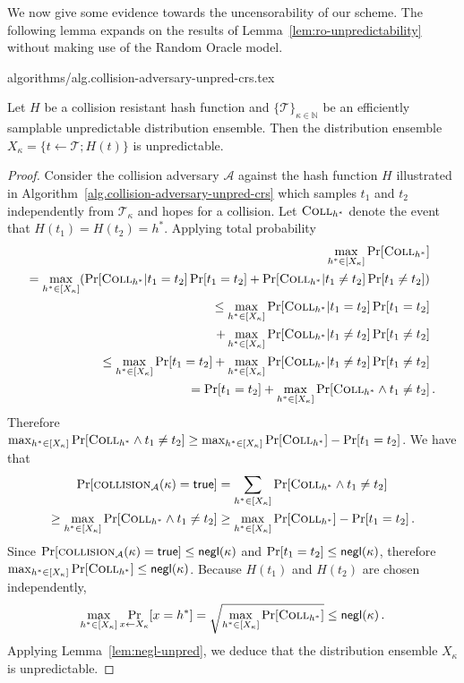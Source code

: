 We now give some evidence towards the uncensorability of our scheme.
The following lemma expands on the results of Lemma~\ref{lem:ro-unpredictability} without making use of the Random Oracle model.

{algorithms/alg.collision-adversary-unpred-crs.tex}

\newcommand{\collstar}{\textsc{Coll}_{h^*}}

\begin{lem}
  Let $H$ be a collision resistant hash function and $\{\mathcal{T}\}_{\kappa\in\mathbb{N}}$ be an
  efficiently samplable unpredictable distribution ensemble. Then the
  distribution ensemble $X_\kappa = \{ t \gets \mathcal{T}; H(t) \}$ is unpredictable.
\end{lem}
\begin{proof}
  Consider the collision adversary $\mathcal{A}$ against the hash function $H$ illustrated in Algorithm~\ref{alg.collision-adversary-unpred-crs} which samples $t_1$ and $t_2$ independently from $\mathcal{T}_\kappa$ and hopes for a collision. Let $\collstar$ denote the event that $H(t_1) = H(t_2) = h^*$.
  Applying total probability
  \begin{align*}
  \max_{h^* \in [X_\kappa]}\Pr[\collstar]&
  \\=
  \max_{h^* \in [X_\kappa]}(\Pr[\collstar|t_1 = t_2]\Pr[t_1 = t_2]
   + \Pr[\collstar|t_1 \neq t_2]\Pr[t_1 \neq t_2])&
  \\\leq
  \max_{h^* \in [X_\kappa]}\Pr[\collstar|t_1 = t_2]\Pr[t_1 = t_2]&
  \\ + \max_{h^* \in [X_\kappa]}\Pr[\collstar|t_1 \neq t_2]\Pr[t_1 \neq t_2]&
  \\\leq
  \max_{h^* \in [X_\kappa]}\Pr[t_1 = t_2]
  + \max_{h^* \in [X_\kappa]}\Pr[\collstar|t_1 \neq t_2]\Pr[t_1 \neq t_2]&
  \\=
  \Pr[t_1 = t_2]
  + \max_{h^* \in [X_\kappa]}\Pr[\collstar \land t_1 \neq t_2]&
  \,.
  \end{align*}
  Therefore $\max_{h^* \in [X_\kappa]}\Pr[\collstar \land t_1 \neq t_2] \geq \max_{h^* \in [X_\kappa]}\Pr[\collstar] - \Pr[t_1 = t_2]$.
  We have that
  \begin{align*}
    \Pr[\collisionattack_{\mathcal{A}}(\kappa) = \true] &=
    \sum_{h^* \in [X_\kappa]} \Pr[\collstar \land t_1 \neq t_2]\\\geq
    \max_{h^* \in [X_\kappa]} \Pr[\collstar \land t_1 \neq t_2]
    &\geq
    \max_{h^* \in [X_\kappa]}\Pr[\collstar] - \Pr[t_1 = t_2]\,.
  \end{align*}
  Since $\Pr[\textsc{collision}_{\mathcal{A}}(\kappa) = \mathsf{true}] \leq \textsf{negl}(\kappa)$
  and $\Pr[t_1 = t_2] \leq \textsf{negl}(\kappa)$, therefore $\max_{h^* \in [X_\kappa]} \Pr[\collstar] \leq \negl$.
  Because $H(t_1)$ and $H(t_2)$ are chosen independently,
  \[
  \max_{h^* \in [X_\kappa]}\Pr_{x \gets X_\kappa}[x = h^*] = \sqrt{\max_{h^* \in [X_\kappa]} \Pr[\collstar]} \leq \negl\,.
  \]
  Applying Lemma~\ref{lem:negl-unpred}, we deduce that the distribution ensemble $X_\kappa$ is unpredictable.
\end{proof}

